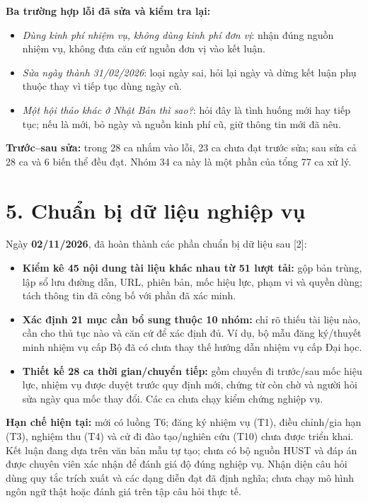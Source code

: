 \documentclass[12pt,a4paper]{article}
\begin{document}
\newpage
\textbf{Ba trường hợp lỗi đã sửa và kiểm tra lại:}
\begin{itemize}
\item \emph{Dùng kinh phí nhiệm vụ, không dùng kinh phí đơn vị}: nhận đúng nguồn nhiệm vụ, không đưa căn cứ nguồn đơn vị vào kết luận.
\item \emph{Sửa ngày thành 31/02/2026}: loại ngày sai, hỏi lại ngày và dừng kết luận phụ thuộc thay vì tiếp tục dùng ngày cũ.
\item \emph{Một hội thảo khác ở Nhật Bản thì sao?}: hỏi đây là tình huống mới hay tiếp tục; nếu là mới, bỏ ngày và nguồn kinh phí cũ, giữ thông tin mới đã nêu.
\end{itemize}
\textbf{Trước--sau sửa:} trong 28 ca nhắm vào lỗi, 23 ca chưa đạt trước sửa; sau sửa cả 28 ca và 6 biến thể đều đạt. Nhóm 34 ca này là một phần của tổng 77 ca xử lý.

\section*{5. Chuẩn bị dữ liệu nghiệp vụ}
Ngày \textbf{02/11/2026}, đã hoàn thành các phần chuẩn bị dữ liệu sau [2]:
\begin{itemize}
\item \textbf{Kiểm kê 45 nội dung tài liệu khác nhau từ 51 lượt tải:} gộp bản trùng, lập sổ lưu đường dẫn, URL, phiên bản, mốc hiệu lực, phạm vi và quyền dùng; tách thông tin đã công bố với phần đã xác minh.
\item \textbf{Xác định 21 mục cần bổ sung thuộc 10 nhóm:} chỉ rõ thiếu tài liệu nào, cần cho thủ tục nào và căn cứ để xác định đủ. Ví dụ, bộ mẫu đăng ký/thuyết minh nhiệm vụ cấp Bộ đã có chưa thay thế hướng dẫn nhiệm vụ cấp Đại học.
\item \textbf{Thiết kế 28 ca thời gian/chuyển tiếp:} gồm chuyến đi trước/sau mốc hiệu lực, nhiệm vụ được duyệt trước quy định mới, chứng từ còn chờ và người hỏi sửa ngày qua mốc thay đổi. Các ca chưa chạy kiểm chứng nghiệp vụ.
\end{itemize}

\textbf{Hạn chế hiện tại:}
mới có luồng T6; đăng ký nhiệm vụ (T1), điều chỉnh/gia hạn (T3), nghiệm thu (T4) và cử đi đào tạo/nghiên cứu (T10) chưa được triển khai. Kết luận đang dựa trên văn bản mẫu tự tạo; chưa có bộ nguồn HUST và đáp án được chuyên viên xác nhận để đánh giá độ đúng nghiệp vụ. Nhận diện câu hỏi dùng quy tắc trích xuất và các dạng diễn đạt đã định nghĩa; chưa chạy mô hình ngôn ngữ thật hoặc đánh giá trên tập câu hỏi thực tế.
\end{document}
